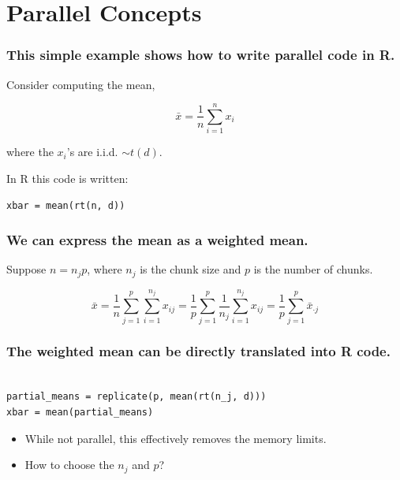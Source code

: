 \documentclass{beamer}
\begin{document}
\section{Parallel Concepts}
\begin{frame}[fragile]

\frametitle{This simple example shows how to write parallel code in R.}

Consider computing the mean,

\begin{equation}
    \bar{x} = \frac{1}{n} \sum_{i = 1}^n x_i
\label{eq:mean}
\end{equation}

where the $x_i$'s are i.i.d. $\sim t(d)$. 
    
In R this code is written:

\begin{verbatim}
xbar = mean(rt(n, d))
\end{verbatim}


\end{frame}
\begin{frame}

    \frametitle{We can express the mean as a weighted mean.}

Suppose $n = n_j p$, where $n_j$ is the chunk size and $p$ is the number of
chunks.

\begin{equation}
    \bar{x} = \frac{1}{n} \sum_{j = 1}^p \sum_{i = 1}^{n_j} x_{ij}
    = \frac{1}{p} \sum_{j = 1}^p \frac{1}{n_j} \sum_{i = 1}^{n_j} x_{ij}
    = \frac{1}{p} \sum_{j = 1}^p \bar{x}_{\cdot j}
\label{eq:mean_partial}
\end{equation}

\end{frame}
\begin{frame}[fragile]

    \frametitle{The weighted mean can be directly translated into R code.}

\begin{verbatim}

partial_means = replicate(p, mean(rt(n_j, d)))
xbar = mean(partial_means)

\end{verbatim}

\pause 

    \begin{itemize}
        \item While not parallel, this effectively removes the memory limits.
        \item How to choose the $n_j$ and $p$?
    \end{itemize}

\end{frame}
\end{document}
